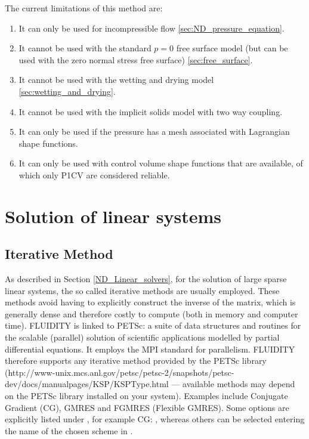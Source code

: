 The current limitations of this method are:
\begin{enumerate}
  \item It can only be used for incompressible flow \ref{sec:ND_pressure_equation}.
  \item It cannot be used with the standard $p=0$ free surface model (but can be used with the zero normal stress free surface) \ref{sec:free_surface}.
  \item It cannot be used with the wetting and drying model \ref{sec:wetting_and_drying}.
  \item It cannot be used with the implicit solids model with two way coupling.
  \item It can only be used if the pressure has a mesh associated with Lagrangian shape functions.
  \item It can only be used with control volume shape functions that are available, of which only P1CV are considered reliable. 
\end{enumerate}

\section{Solution of linear systems}\label{sec:Solve}

\subsection{Iterative Method}
As described in Section \ref{ND_Linear_solvers}, for the solution of large sparse linear systems, the so called iterative methods are usually employed. These methods avoid having to explicitly construct the inverse of the matrix, which is generally dense and therefore costly to compute (both in memory and computer time). FLUIDITY is linked to PETSc: a suite of data structures and routines for the scalable (parallel) solution of scientific applications modelled by partial differential equations.  It employs the MPI standard for parallelism. FLUIDITY therefore supports any iterative method provided by the PETSc library (http://www-unix.mcs.anl.gov/petsc/petsc-2/snapshots/petsc-dev/docs/manualpages/KSP/KSPType.html --- available methods may depend on the PETSc library installed on your system). Examples include Conjugate Gradient (CG), GMRES and FGMRES (Flexible GMRES). Some options are explicitly listed under , for example CG: , whereas 
others can be selected entering the name of the chosen scheme in .

